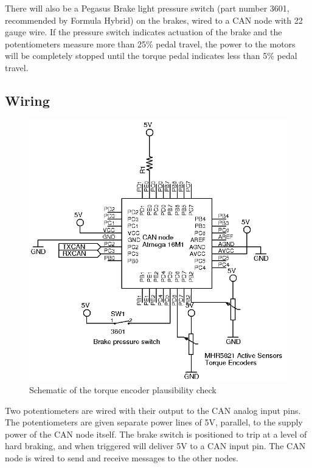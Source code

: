 \documentclass{article}
\begin{document}
        There will also be a Pegasus Brake light pressure switch (part number 3601, recommended by Formula Hybrid) on the brakes, wired to a CAN node with 22 gauge wire. If the pressure switch indicates actuation of the brake and the potentiometers measure more than 25\% pedal travel, the power to the motors will be completely stopped until the torque pedal indicates less than 5\% pedal travel.

    \subsection{Wiring}

        
        \begin{figure}[H]
            \centering
            \includegraphics{torquebrakecheck}
            \caption{Schematic of the torque encoder plausibility check}
            \label{braketorque}
        \end{figure}
        
        Two potentiometers are wired with their output to the CAN analog input pins. The potentiometers are given separate power lines of 5V, parallel, to the supply power of the CAN node itself. The brake switch is positioned to trip at a level of hard braking, and when triggered will deliver 5V to a CAN input pin. The CAN node is wired to send and receive messages to the other nodes. 
\end{document}
